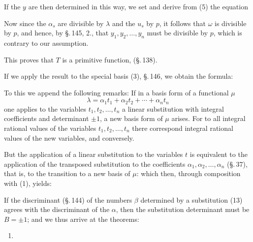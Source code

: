 
If the $y$ are then determined in this way, we set
and derive from (5) the equation

Now since the $\alpha_s$ are divisible by $\lambda$ and the $u_s$ by $p$,
it follows that $\omega$ is divisible by $p$, and hence, by
\S.\,145, 2., that $y_1, y_2, \ldots, y_n$ must be divisible by $p$, which
is contrary to our assumption.

This proves that $T$ is a primitive function,  (\S.\,138).

If we apply the result to the special basis (3), \S.\,146,
we obtain the formula:

To this we append the following remarks: If
in a basis form of a functional $\mu$
\[
\lambda = \alpha_1 t_1 + \alpha_2 t_2 + \cdots + \alpha_n t_n
\]
one applies to the variables $t_1, t_2, \ldots, t_n$ a linear
substitution with integral coefficients and determinant $\pm 1$, a
new basis form of $\mu$ arises. For to all integral rational values
of the variables $t_1, t_2, \ldots, t_n$ there correspond integral rational
values of the new variables, and conversely.

But the application of a linear substitution to the variables $t$
is equivalent to the application of the transposed
substitution to the coefficients $\alpha_1, \alpha_2, \ldots, \alpha_n$ (\S.\,37), that is, to
the transition to a new basis of $\mu$:
which then, through composition with (1), yields:

If the discriminant (\S.\,144) of the numbers $\beta$ determined
by a substitution (13) agrees with the discriminant of the $\alpha$,
then the substitution determinant must be $B = \pm 1$;
and we thus arrive at the theorems:
\begin{enumerate}
\item[1.] 
\end{enumerate}
